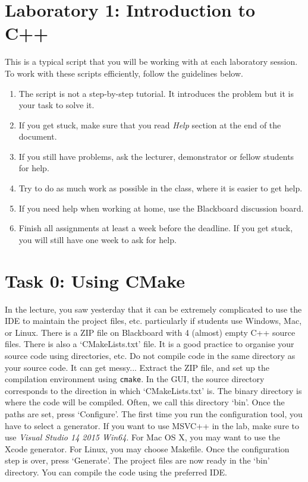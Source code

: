 
\section*{Laboratory 1: Introduction to C++}

This is a typical script that you will be working with at each
laboratory session. To work with these scripts efficiently, follow the
guidelines below.
\begin{enumerate}
  \item The script is not a step-by-step tutorial. It introduces the
    problem but it is your task to solve it.

  \item If you get stuck, make sure that you read \emph{Help} section
    at the end of the document.

  \item If you still have problems, ask the lecturer, demonstrator or
    fellow students for help.

  \item Try to do as much work as possible in the class, where it is
    easier to get help.
    
  \item If you need help when working at home, use the Blackboard
    discussion board.
    
  \item Finish all assignments at least a week before the deadline. If you get
    stuck, you will still have one week to ask for help.
\end{enumerate}

\section{Task 0: Using CMake}

In the lecture, you saw yesterday that it can be extremely complicated to use the IDE to maintain the project files, etc. particularly if students use Windows, Mac, or Linux. 
There is a ZIP file on Blackboard with 4 (almost) empty C++ source files. There is also a `CMakeLists.txt' file. 
It is a good practice to organise your source code using directories, etc. Do not compile code in the same directory as your source code. It can get messy... 
Extract the ZIP file, and set up the compilation environment using \verb+cmake+. 
In the GUI, the source directory corresponds to the direction in which `CMakeLists.txt' is. 
The binary directory is where the code will be compiled. Often, we call this directory `bin'. 
Once the paths are set, press `Configure'. 
The first time you run the configuration tool, you have to select a generator.
If you want to use MSVC++ in the lab, make sure to use \emph{Visual Studio 14 2015 Win64}. 
For Mac OS X, you may want to use the Xcode generator. 
For Linux, you may choose Makefile. 
Once the configuration step is over, press `Generate'. 
The project files are now ready in the `bin' directory. 
You can compile the code using the preferred IDE.

